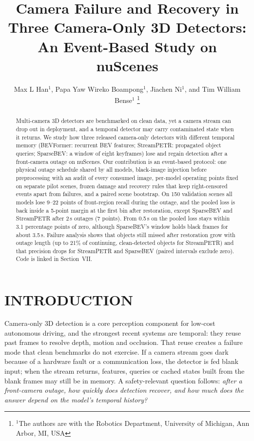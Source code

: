 \documentclass[letterpaper, 10 pt, conference]{ieeeconf}
\title{\LARGE \bf
Camera Failure and Recovery in Three Camera-Only 3D Detectors:\\
An Event-Based Study on nuScenes
}
\author{Max L Han$^{1}$, Papa Yaw Wireko Boampong$^{1}$, Jiachen Ni$^{1}$, and Tim William Bense$^{1}$%
\thanks{$^{1}$The authors are with the Robotics Department, University of Michigan, Ann Arbor, MI, USA}%
}
\begin{document}
\maketitle
\thispagestyle{empty}
\pagestyle{empty}

\begin{abstract}
Multi-camera 3D detectors are benchmarked on clean data, yet a camera stream can drop out in deployment, and a temporal detector may carry
contaminated state when it returns. We study how three released camera-only detectors with different temporal memory (BEVFormer: recurrent BEV
features; StreamPETR: propagated object queries; SparseBEV: a window of eight keyframes) lose and regain detection after a front-camera outage on nuScenes.
Our contribution is an event-based protocol: one physical outage schedule shared by all models, black-image injection before preprocessing with an
audit of every consumed image, per-model operating points fixed on separate pilot scenes, frozen damage and recovery rules that keep right-censored events apart from
failures, and a paired scene bootstrap. On 150 validation scenes all models lose 9--22 points of front-region recall during the outage, and the pooled loss is back inside
a 5-point margin at the first bin after restoration, except SparseBEV and StreamPETR after 2\,s outages (7 points). From 0.5\,s on the pooled loss stays within 3.1 percentage points of zero, although
SparseBEV's window holds black frames for about 3.5\,s. Failure analysis shows that objects still missed after restoration grow with outage length
(up to 21\% of continuing, clean-detected objects for StreamPETR) and that precision drops for StreamPETR and SparseBEV (paired intervals exclude zero). Code is linked in Section~VII.
\end{abstract}

\section{INTRODUCTION}

Camera-only 3D detection is a core perception component for low-cost autonomous driving, and the strongest recent systems are temporal: they
reuse past frames to resolve depth, motion and occlusion. That reuse creates a failure mode that clean benchmarks do not
exercise. If a camera stream goes dark because of a hardware fault or a communication loss, the detector is fed blank input; when the stream returns, features,
queries or cached states built from the blank frames may still be in memory. A safety-relevant question follows: \emph{after a front-camera outage,
how quickly does detection recover, and how much does the answer depend on the model's temporal history?}
\end{document}
